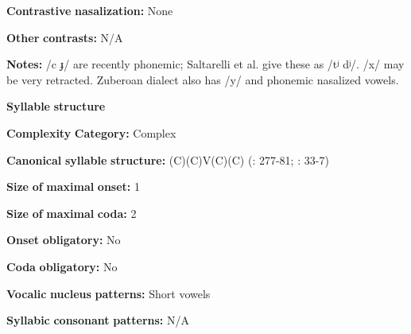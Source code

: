 \begin{styleBody}
\textbf{Contrastive} \textbf{nasalization:} None
\end{styleBody}

\begin{styleBody}
\textbf{Other} \textbf{contrasts:} N/A
\end{styleBody}

\begin{styleBody}
\textbf{Notes:} /c ɟ/ are recently phonemic; Saltarelli et al. give these as /tʲ dʲ/. /x/ may be very retracted. Zuberoan dialect also has /y/ and phonemic nasalized vowels.
\end{styleBody}

\begin{styleBody}
\textbf{Syllable} \textbf{structure}
\end{styleBody}

\begin{styleBody}
\textbf{Complexity} \textbf{Category:} Complex
\end{styleBody}

\begin{styleBody}
\textbf{Canonical} \textbf{syllable} \textbf{structure:} (C)(C)V(C)(C) (\citealt{SaltarelliEtAl1988}: 277-81; \citealt{Hualde2003}: 33-7)
\end{styleBody}

\begin{styleBody}
\textbf{Size} \textbf{of} \textbf{maximal} \textbf{onset:} 1
\end{styleBody}

\begin{styleBody}
\textbf{Size} \textbf{of} \textbf{maximal} \textbf{coda:} 2
\end{styleBody}

\begin{styleBody}
\textbf{Onset} \textbf{obligatory:} No
\end{styleBody}

\begin{styleBody}
\textbf{Coda} \textbf{obligatory:} No
\end{styleBody}

\begin{styleBody}
\textbf{Vocalic} \textbf{nucleus} \textbf{patterns:} Short vowels
\end{styleBody}

\begin{styleBody}
\textbf{Syllabic} \textbf{consonant} \textbf{patterns:} N/A
\end{styleBody}

